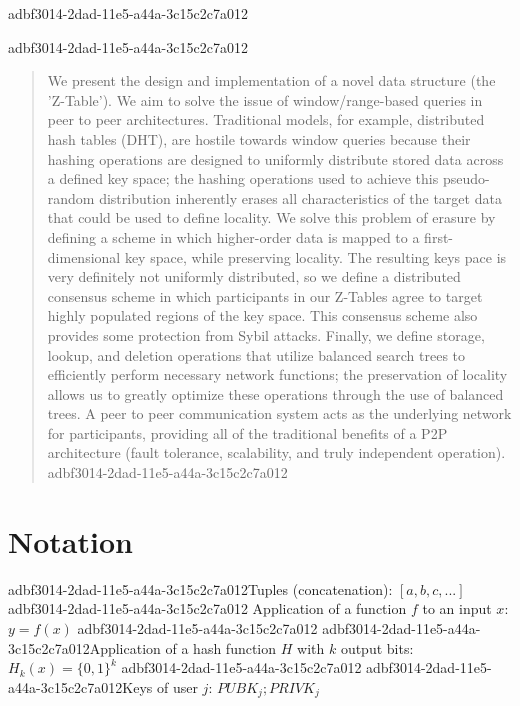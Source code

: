 \documentclass[12pt]{article}
\begin{document}
adbf3014-2dad-11e5-a44a-3c15c2c7a012
\maketitle

adbf3014-2dad-11e5-a44a-3c15c2c7a012\begin{abstract}
We present the design and implementation of a novel data structure (the 'Z-Table'). We aim to solve the issue of window/range-based queries in peer to peer architectures. Traditional models, for example,  distributed hash tables (DHT), are hostile towards window queries because their hashing operations are designed to uniformly distribute stored data across a defined key space; the hashing operations used to achieve this pseudo-random distribution inherently erases all characteristics of the target data that could be used to define locality. We solve this problem of erasure by defining a scheme in which higher-order data is mapped to a first-dimensional key space, while preserving locality. The resulting keys pace is very definitely not uniformly distributed, so we define a distributed consensus scheme in which participants in our Z-Tables agree to target highly populated regions of the key space. This consensus scheme also provides some protection from Sybil attacks. Finally, we define storage, lookup, and deletion operations that utilize balanced search trees to efficiently perform necessary network functions; the preservation of locality allows us to greatly optimize these operations through the use of balanced trees. A peer to peer communication system acts as the underlying network for participants, providing all of the traditional benefits of a P2P architecture (fault tolerance, scalability, and truly independent operation).
adbf3014-2dad-11e5-a44a-3c15c2c7a012\end{abstract}

\section{Notation}

adbf3014-2dad-11e5-a44a-3c15c2c7a012Tuples (concatenation): $[a,b,c,...]$
adbf3014-2dad-11e5-a44a-3c15c2c7a012
Application of a function $f$ to an input $x$: $y=f(x)$
adbf3014-2dad-11e5-a44a-3c15c2c7a012
adbf3014-2dad-11e5-a44a-3c15c2c7a012Application of a hash function $H$ with $k$ output bits: $H_{k}(x) = \{0,1\}^k$
adbf3014-2dad-11e5-a44a-3c15c2c7a012
adbf3014-2dad-11e5-a44a-3c15c2c7a012Keys of user $j$: $ PUBK_j; PRIVK_j $
\end{document}
